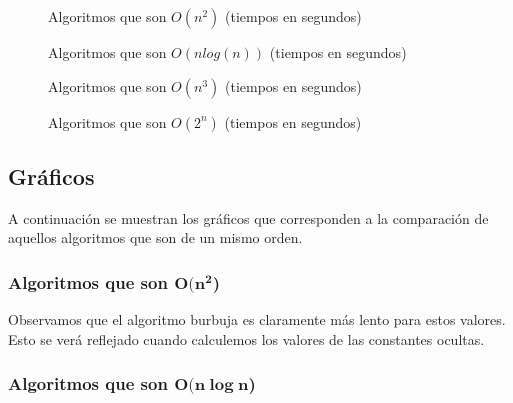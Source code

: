\documentclass[11pt]{article}
\begin{document}
 {\floydlinuxOCero}
 {\hanoilinuxOCero}

\begin{figure}[H]
	\centering
	\caption*{Algoritmos que son $O(n^2)$ (tiempos en segundos)}
	\pgfplotstabletypeset[columns={0, Burbuja, Selección, Inserción}]{\burbujalinuxOCero}
\end{figure}


\begin{figure}[H]
	\centering
	\caption*{Algoritmos que son $O(nlog(n))$ (tiempos en segundos)}
	\pgfplotstabletypeset[columns={0, Mergesort, Quicksort, Heapsort}]{\mergesortlinuxOCero}
\end{figure}

\begin{figure}[H]
	\centering
	\caption*{Algoritmos que son $O(n^3)$ (tiempos en segundos)}
	\pgfplotstabletypeset[columns={0, Floyd}]{\floydlinuxOCero}
\end{figure}


\begin{figure}[H]
	\centering
	\caption*{Algoritmos que son $O(2^n)$ (tiempos en segundos)}
	\pgfplotstabletypeset[columns={0, Hanoi}]{\hanoilinuxOCero}
\end{figure}


    
\subsection*{Gráficos}

A continuación se muestran los gráficos que corresponden a la comparación de aquellos algoritmos que son de un mismo orden.

\subsubsection*{Algoritmos que son $\boldsymbol{O(n^2}$)}

\begin{center}
	
\end{center}

Observamos que el algoritmo burbuja es claramente más lento para estos valores. Esto se verá reflejado cuando calculemos los valores de las constantes ocultas.


\subsubsection*{Algoritmos que son $\boldsymbol{O(n\log n}$)}
\end{document}
